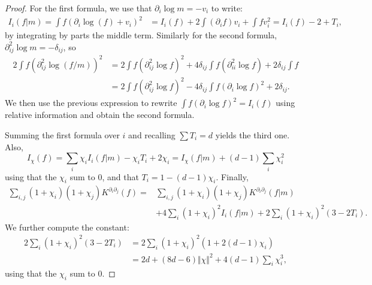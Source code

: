 \documentclass[11pt,a4paper]{article}
\theoremstyle{definition}
\theoremstyle{plain}
\begin{document}
\begin{proof}
    For the first formula, we use that $\partial_i\log m=-v_i$ to write:
    \begin{align*}
        I_{i}(f\vert m)=\int f\left(\partial_i\log\left(f\right)+v_i\right)^2 &=I_{i}(f)+2\int( \partial_if) v_i+\int f v_i^2=I_{i}(f)-2+T_i,
    \end{align*}
    by integrating by parts the middle term.
    Similarly for the second formula, $\partial_{ij}^2\log m=-\delta_{ij}$, so
    \begin{align*}
         2\int f(\partial_{ij}^2\log (f/m) )^2 &=  2\int f(\partial_{ij}^2\log f )^2+4\delta_{ij}\int f(\partial_{ii}^2\log f)+2\delta_{ij}\int f\\
         &=2\int f(\partial_{ij}^2\log f )^2-4\delta_{ij}\int f(\partial_{i}\log f)^2+2\delta_{ij}.
    \end{align*}
    We then use the previous expression to rewrite $\int f(\partial_{i}\log f)^2=I_i(f)$ using relative information and obtain the second formula.

    Summing the first formula over $i$ and recalling $\sum T_i=d$ yields the third one. Also, $$I_\chi(f)=\sum_i \chi_i I_{i}(f\vert m)-\chi_i T_i+2\chi_i= I_\chi(f\vert m)+(d-1)\sum_i\chi_i^2$$
using that the $\chi_i$ sum to $0$, and that $T_i=1-(d-1)\chi_i$. Finally,
\begin{align*}
    \sum_{i,j}(1+\chi_i)(1+\chi_j)K^{\partial_i\partial_j}(f)=&\sum_{i,j}(1+\chi_i)(1+\chi_j)K^{\partial_i\partial_j}(f\vert m)\\
    &+4\sum_{i}(1+\chi_i)^2I_{i}(f\vert m) + 2\sum_i{(1+\chi_i)^2}(3-2T_i).
\end{align*}
We further compute the constant:
\begin{align*}
    2\sum_i{(1+\chi_i)^2}(3-2T_i)&=2\sum_i{(1+\chi_i)^2}(1+2(d-1)\chi_i)\\
    &=2d+(8d-6)\Vert \chi \Vert^2 +4(d-1)\sum_i\chi_i^3,
\end{align*}
using that the $\chi_i$ sum to $0$.
\end{proof}
\end{document}

